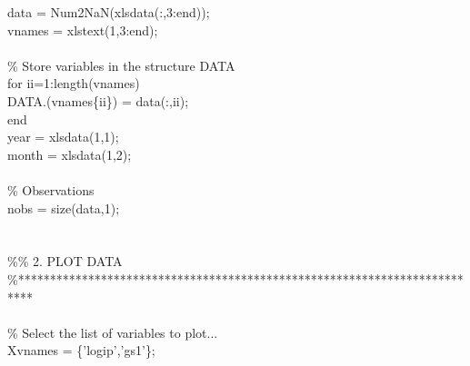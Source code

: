 \hspace{1mm}data   = Num2NaN(xlsdata(:,3:end)); \\ 
\hspace{1mm}vnames = xlstext(1,3:end); \\ 
\hspace{1mm} \\ 
\hspace{1mm}\textcolor{matlabgreen}{\% Store variables in the structure DATA }\\ 
\hspace{1mm}\textcolor{matlabblue}{for} ii=1:length(vnames) \\ 
\hspace{1mm}\hspace{5mm} DATA.(vnames\{ii\}) = data(:,ii); \\ 
\hspace{1mm}\textcolor{matlabblue}{end} \\ 
\hspace{1mm}year = xlsdata(1,1); \\ 
\hspace{1mm}month = xlsdata(1,2); \\ 
\hspace{1mm} \\ 
\hspace{1mm}\textcolor{matlabgreen}{\% Observations }\\ 
\hspace{1mm}nobs = size(data,1); \\ 
\hspace{1mm} \\ 
\hspace{1mm} \\ 
\hspace{1mm}\textcolor{matlabgreen}{\%}\textcolor{matlabgreen}{\% 2. PLOT DATA }\\ 
\hspace{1mm}\textcolor{matlabgreen}{\%**************************************************************************  }\\ 
\hspace{1mm} \\ 
\hspace{1mm}\textcolor{matlabgreen}{\% Select the list of variables to plot... }\\ 
\hspace{1mm}Xvnames = \{\textcolor{matlabpurple}{'logip'},\textcolor{matlabpurple}{'gs1'}\}; \\ 
\hspace{1mm} \\ 
